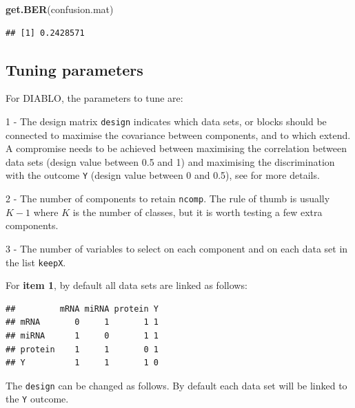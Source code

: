 \documentclass[]{book}
\newenvironment{Shaded}{\begin{snugshade}}{\end{snugshade}}
\newcommand{\KeywordTok}[1]{\textcolor[rgb]{0.13,0.29,0.53}{\textbf{#1}}}
\newcommand{\OperatorTok}[1]{\textcolor[rgb]{0.81,0.36,0.00}{\textbf{#1}}}
\newcommand{\NormalTok}[1]{#1}
\theoremstyle{definition}
\theoremstyle{definition}
\theoremstyle{definition}
\theoremstyle{remark}
\begin{document}
\begin{Shaded}
\begin{Highlighting}[]
\KeywordTok{get.BER}\NormalTok{(confusion.mat)}
\end{Highlighting}
\end{Shaded}

\begin{verbatim}
## [1] 0.2428571
\end{verbatim}

\subsection{Tuning parameters}\label{tuning-parameters-1}

For DIABLO, the parameters to tune are:

1 - The design matrix \texttt{design} indicates which data sets, or
blocks should be connected to maximise the covariance between
components, and to which extend. A compromise needs to be achieved
between maximising the correlation between data sets (design value
between 0.5 and 1) and maximising the discrimination with the outcome
\texttt{Y} (design value between 0 and 0.5), see \citep{Sin16} for more
details.

2 - The number of components to retain \texttt{ncomp}. The rule of thumb
is usually \(K-1\) where \(K\) is the number of classes, but it is worth
testing a few extra components.

3 - The number of variables to select on each component and on each data
set in the list \texttt{keepX}.

For \textbf{item 1}, by default all data sets are linked as follows:

\begin{Shaded}
\end{Shaded}

\begin{verbatim}
##         mRNA miRNA protein Y
## mRNA       0     1       1 1
## miRNA      1     0       1 1
## protein    1     1       0 1
## Y          1     1       1 0
\end{verbatim}

The \texttt{design} can be changed as follows. By default each data set
will be linked to the \texttt{Y} outcome.
\end{document}
